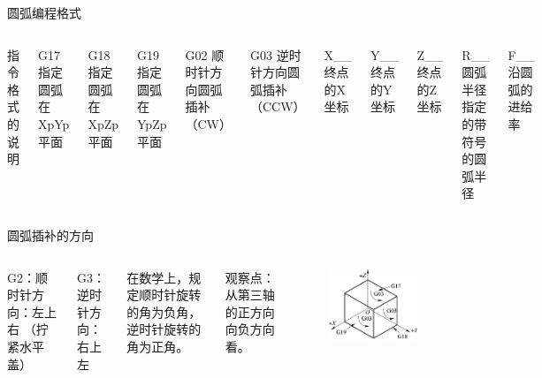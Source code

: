 \documentclass[UTF8,zihao=-4]{ctexbeamer}
\begin{document}
\begin{frame}{圆弧编程格式}
    \begin{columns}
        
      指令格式的说明
      
      G17	指定圆弧在XpYp平面
      
      G18	指定圆弧在XpZp平面
      
      G19	指定圆弧在YpZp平面
      
      G02	顺时针方向圆弧插补（CW）
      
      G03	逆时针方向圆弧插补（CCW）
      
      X\_\_	终点的X坐标
      
      Y\_\_	终点的Y坐标
      
      Z\_\_	终点的Z坐标
      
      R\_\_	圆弧半径指定的带符号的圆弧半径
      
      F\_\_	沿圆弧的进给率           
        
    \end{columns}
\end{frame}



\begin{frame}{圆弧插补的方向}
    \begin{columns}

G2：顺时针方向：左上右 （拧紧水平盖）

G3：逆时针方向：右上左

在数学上，规定顺时针旋转的角为负角，逆时针旋转的角为正角。


观察点：从第三轴的正方向向负方向看。


        
        \begin{figure}
            \centering
            \includegraphics[width=\linewidth]{image/4-2}
            \caption{}
            \label{fig:4-2}
        \end{figure}
        
\end{columns}
\end{frame}
\end{document}
